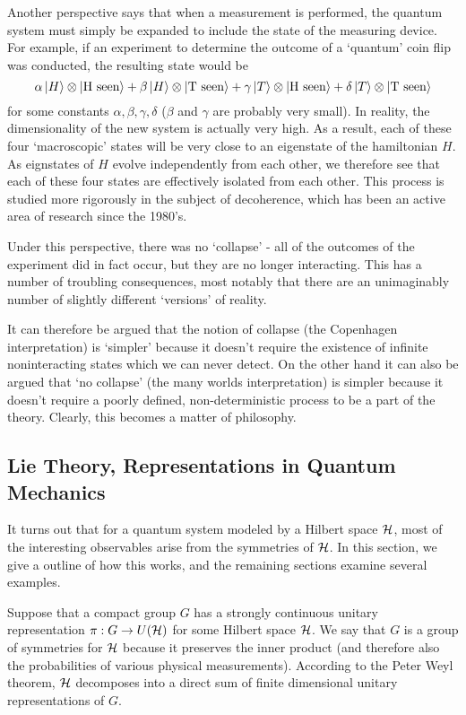 \documentclass[a4paper]{article}
\begin{document}
Another perspective says that when a measurement is performed, the quantum system must simply be expanded to include the state of the measuring device. For example, if an experiment to determine the outcome of a `quantum' coin flip was conducted, the resulting state would be $$\alpha \left\lvert H \right\rangle\otimes\left\lvert \text{H seen} \right\rangle + \beta \left\lvert H \right\rangle\otimes\left\lvert \text{T seen} \right\rangle + \gamma \left\lvert T \right\rangle\otimes\left\lvert \text{H seen} \right\rangle + \delta \left\lvert T \right\rangle\otimes\left\lvert \text{T seen} \right\rangle$$ for some constants $\alpha, \beta, \gamma, \delta$ ($\beta$ and $\gamma$ are probably very small). In reality, the dimensionality of the new system is actually very high. As a result, each of these four `macroscopic' states will be very close to an eigenstate of the hamiltonian $H$. As eignstates of $H$ evolve independently from each other, we therefore see that each of these four states are effectively isolated from each other. This process is studied more rigorously in the subject of decoherence, which has been an active area of research since the 1980's.

Under this perspective, there was no `collapse' - all of the outcomes of the experiment did in fact occur, but they are no longer interacting. This has a number of troubling consequences, most notably that there are an unimaginably number of slightly different `versions' of reality. 

It can therefore be argued that the notion of collapse (the Copenhagen interpretation) is `simpler' because it doesn't require the existence of infinite noninteracting states which we can never detect. On the other hand it can also be argued that `no collapse' (the many worlds interpretation) is simpler because it doesn't require a poorly defined, non-deterministic process to be a part of the theory. Clearly, this becomes a matter of philosophy.

\subsection{Lie Theory, Representations in Quantum Mechanics}
It turns out that for a quantum system modeled by a Hilbert space $\mathcal{H}$, most of the interesting observables arise from the symmetries of $\mathcal{H}$. In this section, we give a outline of how this works, and the remaining sections examine several examples.

Suppose that a compact group $G$ has a strongly continuous unitary representation $\pi: G \to U(\mathcal{H})$ for some Hilbert space $\mathcal{H}$. We say that $G$ is a group of symmetries for $\mathcal{H}$ because it preserves the inner product (and therefore also the probabilities of various physical measurements). According to the Peter Weyl theorem, $\mathcal{H}$ decomposes into a direct sum of finite dimensional unitary representations of $G$.  
\end{document}

